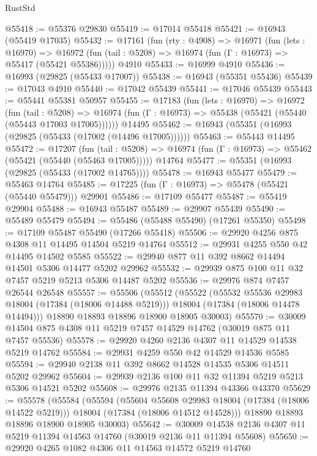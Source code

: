 \begin{lexlean}{RustStd}
\begin{coremodule}
@55418 := @55376 @29830
@55419 := @17014 @55418
@55421 := @16943 (@55419 @17035)
@55432 := @17161
    (fun (rty : @4908) =>
    @16971
      (fun (lets : @16970) =>
      @16972 (fun (tail : @5208) => @16974 (fun (Γ : @16973) => @55417 (@55421 @55386)))))
    @4910
@55433 := @16999 @4910
@55436 := @16993 (@29825 (@55433 @17007))
@55438 := @16943 (@55351 @55436)
@55439 := @17043 @4910
@55440 := @17042 @55439
@55441 := @17046 @55439
@55443 := @55441 @55381 @50957
@55455 := @17183
    (fun (lets : @16970) =>
    @16972
      (fun (tail : @5208) =>
      @16974 (fun (Γ : @16973) => @55438 (@55421 (@55440 (@55443 @17003 @17005))))))
    @14495
@55462 := @16943 (@55351 (@16993 (@29825 (@55433 (@17002 (@14496 @17005))))))
@55463 := @55443 @14495
@55472 := @17207
    (fun (tail : @5208) => @16974 (fun (Γ : @16973) => @55462 (@55421 (@55440 (@55463 @17005)))))
    @14764
@55477 := @55351 (@16993 (@29825 (@55433 (@17002 @14765))))
@55478 := @16943 @55477
@55479 := @55463 @14764
@55485 := @17225 (fun (Γ : @16973) => @55478 (@55421 (@55440 @55479))) @29901
@55486 := @17109 @55477
@55487 := @55419 @29904
@55488 := @16943 @55487
@55489 := @29907 @55439
@55490 := @55489 @55479
@55494 := @55486 (@55488 @55490) (@17261 @55350)
@55498 := @17109 @55487 @55490 (@17266 @55418)
@55506 := @29920 @4256 @875 @4308 @11 @14495 @14504 @5219 @14764
@55512 := @29931 @4255 @550 @42 @14495 @14502 @5585
@55522 := @29940 @877 @11 @392 @8662 @14494 @14501 @5306 @14477 @5202 @29962
@55532 := @29939 @875 @100 @11 @32 @7457 @5219 @5213 @5306 @14487 @5202
@55536 := @29976 @874 @7457 @26544 @26548
@55557 := @55506
    (@55512
      (@55522
        (@55532 @55536 @29983 @18004 (@17384 (@18006 @14488 @5219)))
        @18004
        (@17384 (@18006 @14478 @14494)))
      @18890
      @18893
      @18896
      @18900
      @18905
      @30003)
@55570 := @30009 @14504 @875 @4308 @11 @5219 @7457 @14529 @14762 (@30019 @875 @11 @7457 @55536)
@55578 := @29920 @4260 @2136 @4307 @11 @14529 @14538 @5219 @14762
@55584 := @29931 @4259 @550 @42 @14529 @14536 @5585
@55594 := @29940 @2138 @11 @392 @8662 @14528 @14535 @5306 @14511 @5202 @29962
@55604 := @29939 @2136 @100 @11 @32 @11394 @5219 @5213 @5306 @14521 @5202
@55608 := @29976 @2135 @11394 @43366 @43370
@55629 := @55578
    (@55584
      (@55594
        (@55604 @55608 @29983 @18004 (@17384 (@18006 @14522 @5219)))
        @18004
        (@17384 (@18006 @14512 @14528)))
      @18890
      @18893
      @18896
      @18900
      @18905
      @30003)
@55642 := @30009 @14538 @2136 @4307 @11 @5219 @11394 @14563 @14760 (@30019 @2136 @11 @11394 @55608)
@55650 := @29920 @4265 @1082 @4306 @11 @14563 @14572 @5219 @14760

\end{coremodule}
\end{lexlean}
